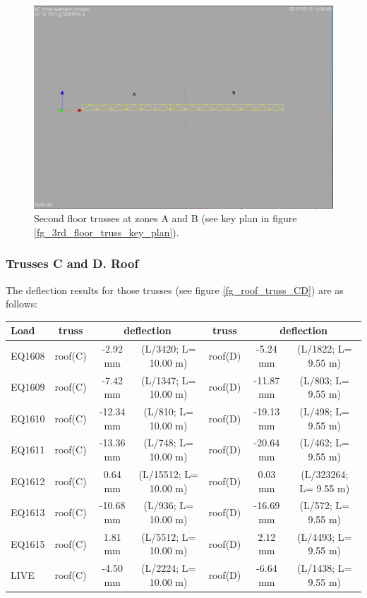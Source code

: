\begin{figure}
  \begin{center}
  \includegraphics[width=120mm]{figures/trusses/2nd_floor_truss_AB}
  \end{center}
  \caption{Second floor trusses at zones A and B (see key plan in figure \ref{fg_3rd_floor_truss_key_plan}).}\label{fg_2nd_floor_truss_AB}
\end{figure}

\subsubsection{Trusses C and D. Roof}
The deflection results for those trusses (see figure \ref{fg_roof_truss_CD}) are as follows:

\begin{center}
  \begin{scriptsize}
  \begin{tabular}{|l|c|c|c|c|c|c|}
    \hline
    \textbf{Load} & \textbf{truss} & \multicolumn{2}{c|}{\textbf{deflection}} & \textbf{truss} & \multicolumn{2}{c|}{\textbf{deflection}} \\
    \hline
EQ1608 & roof(C) & -2.92 mm & (L/3420; L= 10.00 m) & roof(D) & -5.24 mm & (L/1822; L= 9.55 m) \\
EQ1609 & roof(C) & -7.42 mm & (L/1347; L= 10.00 m) & roof(D) & -11.87 mm & (L/803; L= 9.55 m) \\
EQ1610 & roof(C) & -12.34 mm & (L/810; L= 10.00 m) & roof(D) & -19.13 mm & (L/498; L= 9.55 m) \\
EQ1611 & roof(C) & -13.36 mm & (L/748; L= 10.00 m) & roof(D) & -20.64 mm & (L/462; L= 9.55 m) \\
EQ1612 & roof(C) & 0.64 mm & (L/15512; L= 10.00 m) & roof(D) & 0.03 mm & (L/323264; L= 9.55 m) \\
EQ1613 & roof(C) & -10.68 mm & (L/936; L= 10.00 m) & roof(D) & -16.69 mm & (L/572; L= 9.55 m) \\
EQ1615 & roof(C) & 1.81 mm & (L/5512; L= 10.00 m) & roof(D) & 2.12 mm & (L/4493; L= 9.55 m) \\
LIVE & roof(C) & -4.50 mm & (L/2224; L= 10.00 m) & roof(D) & -6.64 mm & (L/1438; L= 9.55 m) \\
\hline
  \end{tabular}
  \end{scriptsize}
\end{center}

